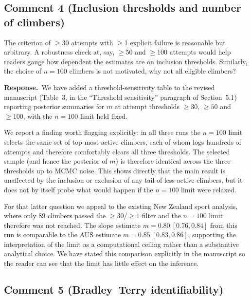 \documentclass[11pt]{article}
\newenvironment{review}{\begingroup\color{revcolor}\itshape\par\noindent}{\par\endgroup}
\newcommand{\response}{\par\noindent\textbf{Response.}\ }
\begin{document}
\subsection*{Comment 4 (Inclusion thresholds and number of climbers)}

\begin{review}
The criterion of $\geq$30 attempts with $\geq$1 explicit failure is reasonable but arbitrary. A robustness check at, say, $\geq$50 and $\geq$100 attempts would help readers gauge how dependent the estimates are on inclusion thresholds. Similarly, the choice of $n = 100$ climbers is not motivated, why not all eligible climbers?
\end{review}
\response We have added a threshold-sensitivity table to the revised manuscript (Table~3, in the ``Threshold sensitivity'' paragraph of Section~5.1) reporting posterior summaries for $m$ at attempt thresholds $\geq 30$, $\geq 50$ and $\geq 100$, with the $n=100$ limit held fixed.

We report a finding worth flagging explicitly: in all three runs the $n=100$ limit selects the same set of top-most-active climbers, each of whom logs hundreds of attempts and therefore comfortably clears all three thresholds. The selected sample (and hence the posterior of $m$) is therefore identical across the three thresholds up to MCMC noise. This shows directly that the main result is unaffected by the inclusion or exclusion of any tail of less-active climbers, but it does not by itself probe what would happen if the $n=100$ limit were relaxed.

For that latter question we appeal to the existing New Zealand sport analysis, where only $89$ climbers passed the $\geq 30$/$\geq 1$ filter and the $n=100$ limit therefore was not reached. The slope estimate $m = 0.80\ [0.76, 0.84]$ from this run is comparable to the AUS estimate $m = 0.85\ [0.83, 0.86]$, supporting the interpretation of the limit as a computational ceiling rather than a substantive analytical choice. We have stated this comparison explicitly in the manuscript so the reader can see that the limit has little effect on the inference.

\subsection*{Comment 5 (Bradley--Terry identifiability)}
\end{document}
